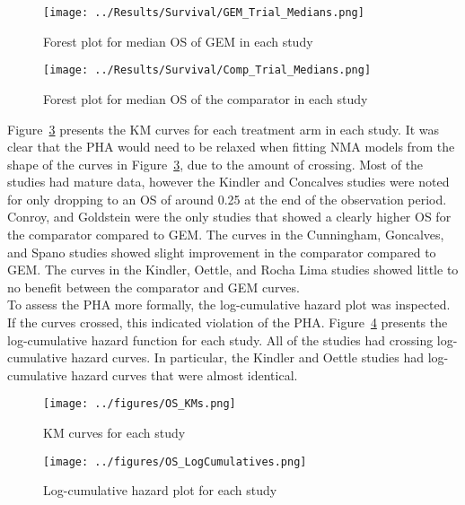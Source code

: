 \begin{figure}[h]
    \centering
    \texttt{[image: ../Results/Survival/GEM\_Trial\_Medians.png]} 
    \caption{Forest plot for median OS of GEM in each study}
    \label{fig:GEMMedForest}
\end{figure}

\begin{figure}[h]
    \centering
    \texttt{[image: ../Results/Survival/Comp\_Trial\_Medians.png]} 
    \caption{Forest plot for median OS of the comparator in each study}
    \label{fig:CompMedForest}
\end{figure}

Figure~\ref{fig:OSKMs} presents the KM curves for each treatment arm in each study. It was clear that the PHA would need to be relaxed when fitting NMA models from the shape of the curves in Figure~\ref{fig:OSKMs}, due to the amount of crossing. Most of the studies had mature data, however the Kindler and Concalves studies were noted for only dropping to an OS of around 0.25 at the end of the observation period. Conroy, and Goldstein were the only studies that showed a clearly higher OS for the comparator compared to GEM. The curves in the Cunningham, Goncalves, and Spano studies showed slight improvement in the comparator compared to GEM. The curves in the Kindler, Oettle, and Rocha Lima studies showed little to no benefit between the comparator and GEM curves. \\

To assess the PHA more formally, the log-cumulative hazard plot was inspected. If the curves crossed, this indicated violation of the PHA. Figure~\ref{fig:OSLCs} presents the log-cumulative hazard function for each study. All of the studies had crossing log-cumulative hazard curves. In particular, the Kindler and Oettle studies had log-cumulative hazard curves that were almost identical. \\

\begin{figure}[h]
    \centering
    \texttt{[image: ../figures/OS\_KMs.png]} 
    \caption{KM curves for each study}
    \label{fig:OSKMs}
\end{figure}

\begin{figure}[h]
    \centering
    \texttt{[image: ../figures/OS\_LogCumulatives.png]} 
    \caption{Log-cumulative hazard plot for each study}
    \label{fig:OSLCs}
\end{figure}

